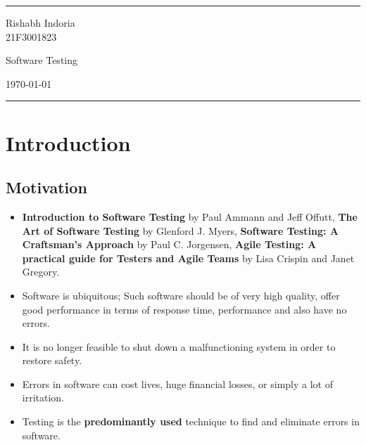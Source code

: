\documentclass[a4paper]{article}
\begin{document}
\fancyhead[c]{}
\hrule \medskip
\begin{minipage}{0.295\textwidth}
\raggedright
Rishabh Indoria\\
21F3001823
\end{minipage}
\begin{minipage}{0.4\textwidth}
\centering
\LARGE
Software Testing
\end{minipage}
\begin{minipage}{0.295\textwidth}
\raggedleft
\today \hfill \\
\end{minipage}
\medskip \hrule
\bigskip

\section{Introduction}
\subsection{Motivation}
\begin{itemize}
    \item \textbf{Introduction to Software Testing} by Paul Ammann and Jeff Offutt, \textbf{The Art of Software Testing} by Glenford J. Myers, \textbf{Software Testing: A Craftsman's Approach} by Paul C. Jorgensen, \textbf{Agile Testing: A practical guide for Testers and Agile Teams} by Lisa Crispin and Janet Gregory.
    \item Software is ubiquitous; Such software should be of very high quality, offer good performance in terms of response time, performance and also have no errors.
    \item It is no longer feasible to shut down a malfunctioning system in order to restore safety.
    \item Errors in software can cost lives, huge financial losses, or simply a lot of irritation.
    \item Testing is the \textbf{predominantly used} technique to find and eliminate errors in software.
\end{itemize}
\end{document}
